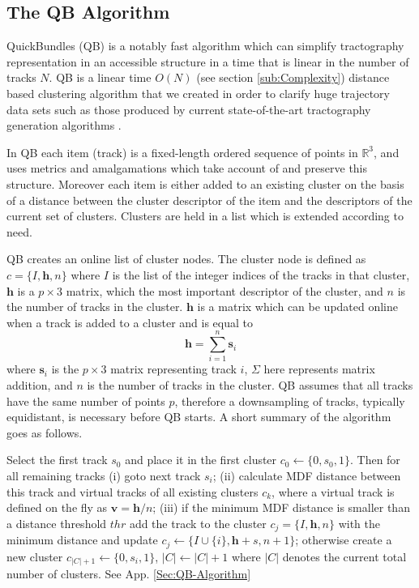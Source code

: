\documentclass[preprint,authoryear,a4paper,10pt,onecolumn]{elsarticle}
\begin{document}
\subsection{The QB Algorithm}

QuickBundles (QB) is a notably fast algorithm which can simplify
tractography representation in an accessible structure in a time that is
linear in the number of tracks $N$. QB is a linear time $O(N)$ (see
section \ref{sub:Complexity}) distance based clustering algorithm that
we created in order to clarify huge trajectory data sets such as those
produced by current state-of-the-art tractography generation algorithms
\citep{Parker2003,WWS+08}. 

In QB each item (track) is a fixed-length
ordered sequence of points in $\mathbb{R}^{3}$, and uses metrics and
amalgamations which take account of and preserve this structure.
Moreover each item is either added to an existing cluster on the basis
of a distance between the cluster descriptor of the item and the
descriptors of the current set of clusters. Clusters are held in a list
which is extended according to need.

QB creates an online list of cluster nodes. The cluster node is defined
as $c=\{I,\mathbf{h},n\}$ where $I$ is the list of the integer indices
of the tracks in that cluster, $\mathbf{h}$ is a $p\times3$ matrix,
which the most important descriptor of the cluster, and $n$ is the
number of tracks in the cluster. $\mathbf{h}$ is a matrix which can be
updated online when a track is added to a cluster and is equal
to 
\begin{equation}
  \mathbf{h}=\sum_{i=1}^{n}\mathbf{s}_{i}
\end{equation} 
where $\mathbf{s}_{i}$ is the $p\times3$ matrix representing track $i$,
$\Sigma$ here represents matrix addition, and $n$ is the number of
tracks in the cluster. QB assumes that all tracks have the same number
of points $p$, therefore a downsampling of tracks, typically
equidistant, is necessary before QB starts. A short summary of the
algorithm goes as follows.

Select the first track $s_{0}$ and place it in the first cluster
$c_{0}\leftarrow\{0,s_{0},1\}$. Then for all remaining tracks (i) goto
next track $s_{i}$; (ii) calculate MDF distance between this track and
virtual tracks of all existing clusters $c_{k}$, where a virtual track
is defined on the fly as $\mathbf{v}=\mathbf{h}/n$; (iii) if the minimum
MDF distance is smaller than a distance threshold
$\mathrm{\mathit{thr}}$ add the track to the cluster
$c_{j}=\{I,\mathbf{h},n\}$ with the minimum distance and update
$c_{j}\leftarrow\{I\cup\{i\},\mathbf{h}+s,n+1\}$; otherwise create a new
cluster $c_{|C|+1}\leftarrow\{0,s_{i},1\}$, $|C|\leftarrow|C|+1$ where
$|C|$ denotes the current total number of clusters. See
App. \ref{Sec:QB-Algorithm}
\end{document}
